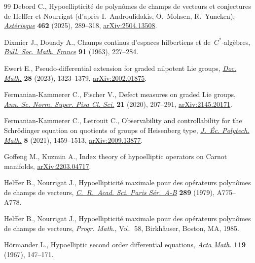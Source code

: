 \begin{thebibliography}{99}
Debord C., Hypoellipticit\'e de polyn\^omes de champs de vecteurs et
 conjectures de {H}elffer et {N}ourrigat (d'apr\`es {I}.~{A}ndroulidakis, {O}.~{M}ohsen, {R}.~{Y}uncken), \href{https://doi.org/10.24033/ast.1261}{\textit{Ast\'erisque}} \textbf{462} (2025), 289--318,
 \href{https://arxiv.org/abs/2504.13508}{arXiv:2504.13508}.

Dixmier J., Douady A., Champs continus d'espaces hilbertiens et de~{$C^{\ast}
 $}-alg\`ebres, \href{https://doi.org/10.24033/bsmf.1596}{\textit{Bull. Soc.
 Math. France}} \textbf{91} (1963), 227--284.

Ewert E., Pseudo-differential extension for graded nilpotent {L}ie groups,
 \href{https://doi.org/10.4171/dm/940}{\textit{Doc. Math.}} \textbf{28}
 (2023), 1323--1379,
 \href{https://arxiv.org/abs/2002.01875}{arXiv:2002.01875}.

Fermanian-Kammerer C., Fischer V., Defect measures on graded {L}ie groups,
 \href{https://doi.org/10.2422/2036-2145.201711_011}{\textit{Ann. Sc. Norm.
 Super. Pisa Cl. Sci.}} \textbf{21} (2020), 207--291,
 \href{https://arxiv.org/abs/2145.20171}{arXiv:2145.20171}.

Fermanian-Kammerer C., Letrouit C., Observability and controllability for the
 {S}chr\"odinger equation on quotients of groups of {H}eisenberg type,
 \href{https://doi.org/10.5802/jep.176}{\textit{J.~\'Ec. Polytech. Math.}}
 \textbf{8} (2021), 1459--1513,
 \href{https://arxiv.org/abs/2009.13877}{arXiv:2009.13877}.

Goffeng M., Kuzmin A., Index theory of hypoelliptic operators on {C}arnot
 manifolds, \href{https://arxiv.org/abs/2203.04717}{arXiv:2203.04717}.

Helffer B., Nourrigat J., Hypoellipticit\'e maximale pour des op\'erateurs
 polyn\^omes de champs de vecteurs,
 \href{https://doi.org/10.5802/jedp.206}{\textit{C.~R.~Acad. Sci. Paris
 S\'er.~A-B}} \textbf{289} (1979), A775--A778.

Helffer B., Nourrigat J., Hypoellipticit\'e maximale pour des op\'erateurs
 polyn\^omes de champs de vecteurs, \textit{Progr. Math.}, Vol.~58,
 Birkh\"auser, Boston, MA, 1985.

H\"ormander L., Hypoelliptic second order differential equations,
 \href{https://doi.org/10.1007/BF02392081}{\textit{Acta Math.}} \textbf{119}
 (1967), 147--171.


\end{thebibliography}
